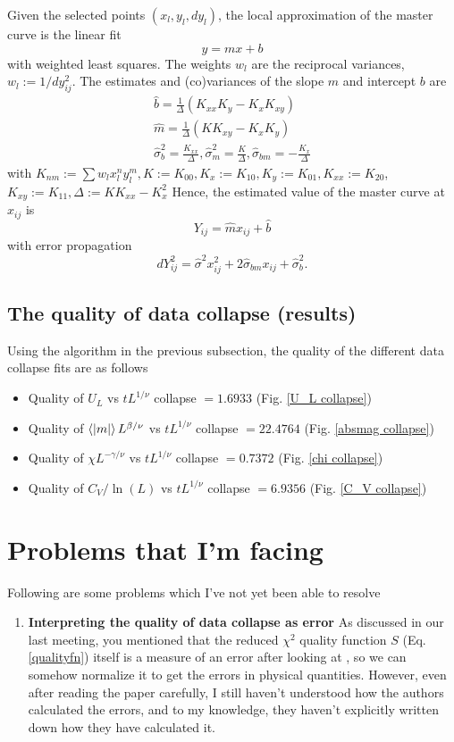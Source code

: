 \documentclass[../journal_main.tex]{subfiles}
\begin{document}
Given the selected points $\left(x_{l}, y_{l}, d y_{l}\right)$, the local approximation of the master curve is the linear fit
$$
y=m x+b
$$
with weighted least squares. The weights $w_{l}$ are the reciprocal variances, $w_{l}:=1 / d y_{i j}^{2}$. The estimates and (co)variances of the slope $m$ and intercept $b$ are
$$
\begin{gathered}
\hat{b}=\frac{1}{\Delta}\left(K_{x x} K_{y}-K_{x} K_{x y}\right) \\
\hat{m}=\frac{1}{\Delta}\left(K K_{x y}-K_{x} K_{y}\right) \\
\hat{\sigma}_{b}^{2}=\frac{K_{x x}}{\Delta}, \hat{\sigma}_{m}^{2}=\frac{K}{\Delta}, \hat{\sigma}_{b m}=-\frac{K_{x}}{\Delta}
\end{gathered}
$$
with $K_{n m}:=\sum w_{l} x_{l}^{n} y_{l}^{m}, K:=K_{00}, K_{x}:=K_{10}, K_{y}:=K_{01}, K_{x x}:=K_{20}$, $K_{x y}:=K_{11}, \Delta:=K K_{x x}-K_{x}^{2}$
Hence, the estimated value of the master curve at $x_{i j}$ is
$$
Y_{i j}=\hat{m} x_{i j}+\hat{b}
$$
with error propagation
$$
d Y_{i j}^{2}=\hat{\sigma}^{2} x_{i j}^{2}+2 \hat{\sigma}_{b m} x_{i j}+\hat{\sigma}_{b}^{2} .
$$

\subsection{The quality of data collapse (results)}
Using the algorithm in the previous subsection, the quality of the different data collapse fits are as follows 
\begin{itemize}[label={}]
    \item Quality of $U_L$ vs $tL^{1/\nu}$ collapse $ = 1.6933$ (Fig. \ref{U_L collapse})
    \item Quality of $\expval{\abs{m}} L^{\beta/\nu}$ vs $tL^{1/\nu }$ collapse $ = 22.4764$ (Fig. \ref{absmag collapse})
    \item Quality of $\chi L^{-\gamma/\nu}$ vs $tL^{1/\nu}$ collapse $ = 0.7372$ (Fig. \ref{chi collapse})
    \item Quality of $C_V/\ln(L)$ vs $tL^{1/\nu}$ collapse $ = 6.9356$ (Fig. \ref{C_V collapse})      
\end{itemize} 

\section{Problems that I'm facing}
Following are some problems which I've not yet been able to resolve
\begin{enumerate}
    \item \textbf{Interpreting the quality of data collapse as error} \:\:\: As discussed in our last meeting, you mentioned that the reduced $\chi^2$ quality function $S$ (Eq. \eqref{qualityfn}) itself is a measure of an error after looking at \cite{Houdayer_2004}, so we can somehow normalize it to get the errors in physical quantities. However, even after reading the paper carefully, I still haven't understood how the authors calculated the errors, and to my knowledge, they haven't explicitly written down how they have calculated it.
\end{enumerate}
\end{document}
